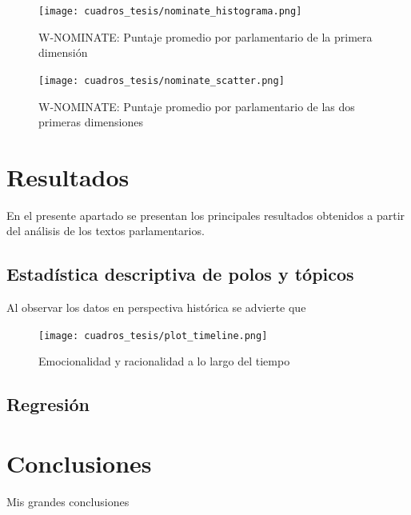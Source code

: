 \documentclass[
  12pt,
]{article}
\begin{document}
\begin{figure}[H]
\centering
\large
\caption{W-NOMINATE: Puntaje promedio por parlamentario de la primera dimensión}
\label{w_nominate_hist}
\texttt{[image: cuadros\_tesis/nominate\_histograma.png]}
\normalsize
\end{figure}

\begin{figure}[H]
\centering
\large
\caption{W-NOMINATE: Puntaje promedio por parlamentario de las dos primeras dimensiones}
\label{w_nominate_scatter}
\texttt{[image: cuadros\_tesis/nominate\_scatter.png]}
\normalsize
\end{figure}

\newpage

\hypertarget{resultados}{%
\section{Resultados}\label{resultados}}

En el presente apartado se presentan los principales resultados
obtenidos a partir del análisis de los textos parlamentarios.

\hypertarget{estaduxedstica-descriptiva-de-polos-y-tuxf3picos}{%
\subsection{Estadística descriptiva de polos y
tópicos}\label{estaduxedstica-descriptiva-de-polos-y-tuxf3picos}}

Al observar los datos en perspectiva histórica se advierte que

\begin{figure}[H]
\centering
\large
\caption{Emocionalidad y racionalidad a lo largo del tiempo}
\label{w_nominate_plot}
\texttt{[image: cuadros\_tesis/plot\_timeline.png]}
\normalsize
\end{figure}

\hypertarget{regresiuxf3n}{%
\subsection{Regresión}\label{regresiuxf3n}}

\newpage

\hypertarget{conclusiones}{%
\section{Conclusiones}\label{conclusiones}}

Mis grandes conclusiones
\end{document}
